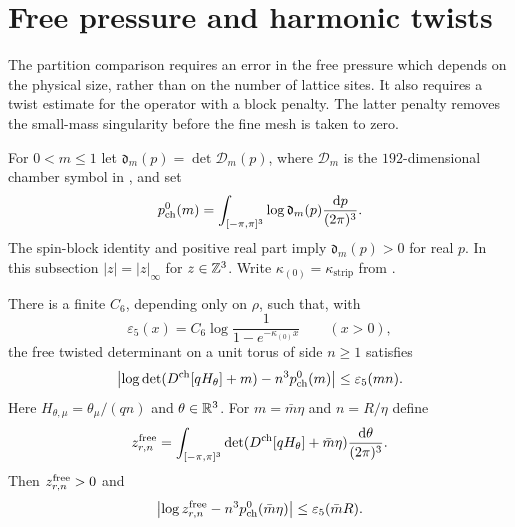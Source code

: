 \section{Free pressure and harmonic twists}
\label{subsec:term-free-determinants}

The partition comparison requires an error in the free pressure
which depends on the physical size, rather than on the number of
lattice sites. It also requires a twist estimate for the operator
with a block penalty. The latter penalty removes the small-mass
singularity before the fine mesh is taken to zero.

For $0<m\le1$ let
$\mathfrak d_m(p)=\det\mathcal D_m(p)$, where
$\mathcal D_m$ is the $192$-dimensional chamber symbol in
\cite[\S2.2]{FermionBlock}, and set
\begin{equation}\label{eq:term-free-pressure}
 p_{\rm ch}^0(m)=
       \int_{[-\pi,\pi]^3}\log\mathfrak d_m(p)
                                      \frac{\mathrm d p}{(2\pi)^3}.
\end{equation}
The spin-block identity and positive real part imply
$\mathfrak d_m(p)>0$ for real $p$.
In this subsection $|z|=|z|_\infty$ for $z\in\mathbb Z^3$.
Write $\kappa_{(0)}=\kappa_{\mathrm{strip}}$ from
\cite[Proposition~2.2]{FermionBlock}.

\begin{proposition}\label{prop:term-free-pressure}
There is a finite $C_6$, depending only on $\rho$, such that,
with
\begin{equation}\label{eq:term-epsilon-five}
 \varepsilon_5(x)=
 C_6\log\frac1{1-e^{-\kappa_{(0)}x}}\qquad(x>0),
\end{equation}
the free twisted determinant on a unit torus of side $n\ge1$
satisfies
\begin{equation}\label{eq:term-free-pressure-error}
 \left|\log\det(D^{\rm ch}[qH_\theta]+m)
                     -n^3p_{\rm ch}^0(m)\right|
                                 \le\varepsilon_5(mn).
\end{equation}
Here $H_{\theta,\mu}=\theta_\mu/(qn)$ and $\theta\in\mathbb R^3$.
For $m=\bar m\eta$ and $n=R/\eta$ define
\[
 z_{r,n}^{\rm free}
       =\int_{[-\pi,\pi]^3}
            \det(D^{\rm ch}[qH_\theta]+\bar m\eta)
                                         \frac{\mathrm d\theta}{(2\pi)^3}.
\]
Then $z_{r,n}^{\rm free}>0$ and
\begin{equation}\label{eq:term-free-average-error}
 \left|\log z_{r,n}^{\rm free}
                 -n^3p_{\rm ch}^0(\bar m\eta)\right|
                              \le\varepsilon_5(\bar mR).
\end{equation}
\end{proposition}

